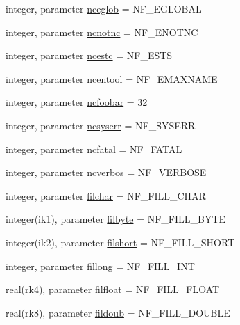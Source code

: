 \begin{DoxyCompactItemize}
integer, parameter \hyperlink{namespacenetcdf__nf__data_acd598d65a90ae610ec8c36dc63624fe2}{nceglob} = N\+F\+\_\+\+E\+G\+L\+O\+B\+AL
\item 
integer, parameter \hyperlink{namespacenetcdf__nf__data_a7887a4216eec236300a3e90dbf3dda74}{ncnotnc} = N\+F\+\_\+\+E\+N\+O\+T\+NC
\item 
integer, parameter \hyperlink{namespacenetcdf__nf__data_acc1032f6b8020ae57c664b22f3161bf7}{ncestc} = N\+F\+\_\+\+E\+S\+TS
\item 
integer, parameter \hyperlink{namespacenetcdf__nf__data_aa9bc47547a7261640aebf2e20f967866}{ncentool} = N\+F\+\_\+\+E\+M\+A\+X\+N\+A\+ME
\item 
integer, parameter \hyperlink{namespacenetcdf__nf__data_aad2cb51e82e60bfb7499e5f251482faa}{ncfoobar} = 32
\item 
integer, parameter \hyperlink{namespacenetcdf__nf__data_a1ce26f218da522526f3bb20543e9c1c4}{ncsyserr} = N\+F\+\_\+\+S\+Y\+S\+E\+RR
\item 
integer, parameter \hyperlink{namespacenetcdf__nf__data_a3c44eb7317355a785acb2879bc8d9836}{ncfatal} = N\+F\+\_\+\+F\+A\+T\+AL
\item 
integer, parameter \hyperlink{namespacenetcdf__nf__data_ac74be92e9885bedd9ae5a5640352740e}{ncverbos} = N\+F\+\_\+\+V\+E\+R\+B\+O\+SE
\item 
integer, parameter \hyperlink{namespacenetcdf__nf__data_acbdcbd98efe04141031a6af275d611e8}{filchar} = N\+F\+\_\+\+F\+I\+L\+L\+\_\+\+C\+H\+AR
\item 
integer(ik1), parameter \hyperlink{namespacenetcdf__nf__data_a17562ee56c26af08b2773cbc1f8ab9f6}{filbyte} = N\+F\+\_\+\+F\+I\+L\+L\+\_\+\+B\+Y\+TE
\item 
integer(ik2), parameter \hyperlink{namespacenetcdf__nf__data_af13f87c54c776a72a7176c396daa0331}{filshort} = N\+F\+\_\+\+F\+I\+L\+L\+\_\+\+S\+H\+O\+RT
\item 
integer, parameter \hyperlink{namespacenetcdf__nf__data_adaf0ece658812a591dca054cf56fa372}{fillong} = N\+F\+\_\+\+F\+I\+L\+L\+\_\+\+I\+NT
\item 
real(rk4), parameter \hyperlink{namespacenetcdf__nf__data_a48e1b09e7c4e80fed6bb3d442432ca59}{filfloat} = N\+F\+\_\+\+F\+I\+L\+L\+\_\+\+F\+L\+O\+AT
\item 
real(rk8), parameter \hyperlink{namespacenetcdf__nf__data_a177e262787afc3c17e1a0a695e58ecba}{fildoub} = N\+F\+\_\+\+F\+I\+L\+L\+\_\+\+D\+O\+U\+B\+LE
\end{DoxyCompactItemize}


